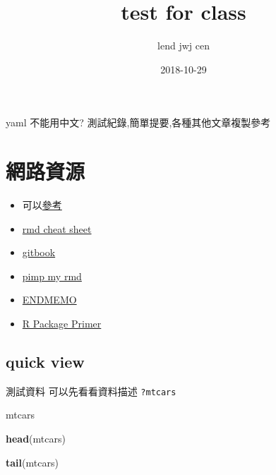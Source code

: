 \documentclass[]{book}
\title{test for class}
\author{lend jwj cen}
\date{2018-10-29}
\newenvironment{Shaded}{\begin{snugshade}}{\end{snugshade}}
\newcommand{\KeywordTok}[1]{\textcolor[rgb]{0.13,0.29,0.53}{\textbf{#1}}}
\newcommand{\NormalTok}[1]{#1}
\providecommand{\tightlist}{%
  \setlength{\itemsep}{0pt}\setlength{\parskip}{0pt}}
\theoremstyle{definition}
\theoremstyle{definition}
\theoremstyle{definition}
\theoremstyle{remark}
\begin{document}
\maketitle

{
\setcounter{tocdepth}{1}
\tableofcontents
}
yaml 不能用中文? 測試紀錄,簡單提要,各種其他文章複製參考

\chapter{網路資源}

\begin{itemize}
\tightlist
\item
  可以\href{https://github.com/rstudio/rstudio-conf/tree/master/2017/Advanced\%20R\%20Markdown\%20-\%20Yihui\%20Xie}{參考}
\item
  \href{https://www.rstudio.com/wp-content/uploads/2016/03/rmarkdown-cheatsheet-2.0.pdf}{rmd
  cheat sheet}
\item
  \href{https://www.r-bloggers.com/using-gitbook-with-r-markdown/}{gitbook}
\item
  \href{https://holtzy.github.io/Pimp-my-rmd/\#link}{pimp my rmd}
\item
  \href{http://www.endmemo.com/program/R/grepl.php}{ENDMEMO}
\item
  \href{http://kbroman.org/pkg_primer/}{R Package Primer}
\end{itemize}

\hypertarget{quick-view}{%
\section{quick view}\label{quick-view}}

測試資料 可以先看看資料描述 \texttt{?mtcars}

\begin{Shaded}
\begin{Highlighting}[]
\NormalTok{mtcars}
\end{Highlighting}
\end{Shaded}

\begin{Shaded}
\begin{Highlighting}[]
\KeywordTok{head}\NormalTok{(mtcars)}
\end{Highlighting}
\end{Shaded}

\begin{Shaded}
\begin{Highlighting}[]
\KeywordTok{tail}\NormalTok{(mtcars)}
\end{Highlighting}
\end{Shaded}
\end{document}
